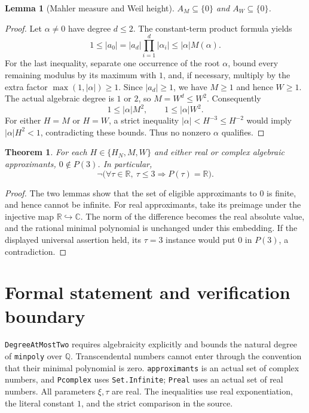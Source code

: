 \documentclass[11pt]{article}
\newtheorem{theorem}{Theorem}
\newtheorem{lemma}{Lemma}
\newcommand{\R}{\mathbb R}
\newcommand{\C}{\mathbb C}
\newcommand{\Q}{\mathbb Q}
\newcommand{\code}[1]{\nolinkurl{#1}}
\begin{document}
\begin{lemma}[Mahler measure and Weil height]
$A_M\subseteq\{0\}$ and $A_W\subseteq\{0\}$.
\end{lemma}
\begin{proof}
Let $\alpha\ne0$ have degree $d\leq2$. The constant-term product formula yields
\[
 1\leq |a_0|=|a_d|\prod_{i=1}^d|\alpha_i|\leq |\alpha|M(\alpha).
\]
For the last inequality, separate one occurrence of the root $\alpha$, bound
every remaining modulus by its maximum with $1$, and, if necessary, multiply
by the extra factor $\max(1,|\alpha|)\geq1$.
Since $|a_d|\geq1$, we have $M\geq1$ and hence $W\geq1$.
The actual algebraic degree is $1$ or $2$, so $M=W^d\leq W^2$.
Consequently
\[
 1\leq |\alpha|M^2,\qquad 1\leq |\alpha|W^2.
\]
For either $H=M$ or $H=W$, a strict inequality
$|\alpha|<H^{-3}\leq H^{-2}$ would imply $|\alpha|H^2<1$,
contradicting these bounds. Thus no nonzero $\alpha$ qualifies.
\end{proof}

\begin{theorem}
For each $H\in\{H_N,M,W\}$ and either real or complex algebraic approximants,
$0\notin P(3)$. In particular,
\[
 \neg\bigl(\forall\tau\in\R,\ \tau\leq3\Longrightarrow P(\tau)=\R\bigr).
\]
\end{theorem}
\begin{proof}
The two lemmas show that the set of eligible approximants to $0$ is finite,
and hence cannot be infinite. For real approximants, take its preimage under
the injective map $\R\hookrightarrow\C$. The norm of the difference becomes
the real absolute value, and the rational minimal polynomial is unchanged
under this embedding. If the displayed universal assertion held, its
$\tau=3$ instance would put $0$ in $P(3)$, a contradiction.
\end{proof}

\section{Formal statement and verification boundary}
\code{DegreeAtMostTwo} requires algebraicity explicitly and bounds the natural
degree of \code{minpoly} over $\Q$. Transcendental numbers cannot enter through
the convention that their minimal polynomial is zero.
\code{approximants} is an actual set of complex numbers, and \code{Pcomplex}
uses \code{Set.Infinite}; \code{Preal} uses an actual set of real numbers.
All parameters $\xi,\tau$ are real. The inequalities use real exponentiation,
the literal constant $1$, and the strict comparison in the source.
\end{document}

